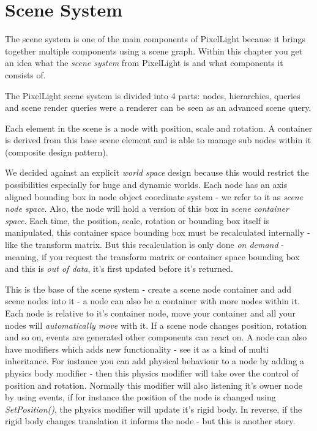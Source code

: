 \section{Scene System}
The scene system is one of the main components of PixelLight because it brings together multiple components using a scene graph. Within this chapter you get an idea what the \emph{scene system} from PixelLight is and what components it consists of.

The PixelLight scene system is divided into 4 parts: nodes, hierarchies, queries and scene render queries were a renderer can be seen as an advanced scene query.

Each element in the scene is a node with position, scale and rotation. A container is derived from this base scene element and is able to manage sub nodes within it (composite design pattern).

We decided against an explicit \emph{world space} design because this would restrict the possibilities especially for huge and dynamic worlds. Each node has an axis aligned bounding box in node object coordinate system - we refer to it as \emph{scene node space}. Also, the node will hold a version of this box in \emph{scene container space}. Each time, the position, scale, rotation or bounding box itself is manipulated, this container space bounding box must be recalculated internally - like the transform matrix. But this recalculation is only done \emph{on demand} - meaning, if you request the transform matrix or container space bounding box and this is \emph{out of data}, it's first updated before it's returned.

This is the base of the scene system - create a scene node container and add scene nodes into it - a node can also be a container with more nodes within it. Each node is relative to it's container node, move your container and all your nodes will \emph{automatically move} with it. If a scene node changes position, rotation and so on, events are generated other components can react on. A node can also have modifiers which adds new functionality - see it as a kind of multi inheritance. For instance you can add physical behaviour to a node by adding a physics body modifier - then this physics modifier will take over the control of position and rotation. Normally this modifier will also listening it's owner node by using events, if for instance the position of the node is changed using \emph{SetPosition()}, the physics modifier will update it's rigid body. In reverse, if the rigid body changes translation it informs the node - but this is another story.


